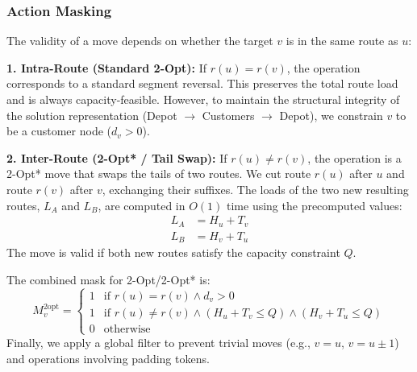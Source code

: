 \documentclass[letterpaper]{article} %
\begin{document}
\subsubsection{Action Masking}
The validity of a move depends on whether the target $v$ is in the same route as $u$:

\textbf{1. Intra-Route (Standard 2-Opt):}
If $r(u) = r(v)$, the operation corresponds to a standard segment reversal. This preserves the total route load and is always capacity-feasible. However, to maintain the structural integrity of the solution representation (Depot $\to$ Customers $\to$ Depot), we constrain $v$ to be a customer node ($d_v > 0$).

\textbf{2. Inter-Route (2-Opt* / Tail Swap):}
If $r(u) \neq r(v)$, the operation is a 2-Opt* move that swaps the tails of two routes. We cut route $r(u)$ after $u$ and route $r(v)$ after $v$, exchanging their suffixes. The loads of the two new resulting routes, $L_A$ and $L_B$, are computed in $O(1)$ time using the precomputed values:
\begin{align}
    L_A &= H_u + T_v \\
    L_B &= H_v + T_u
\end{align}
The move is valid if both new routes satisfy the capacity constraint $Q$.

The combined mask for 2-Opt/2-Opt* is:
\begin{equation}
    M_v^{\text{2opt}} =
    \begin{cases}
        1 & \text{if } r(u) = r(v) \land d_v > 0 \\
        1 & \text{if } r(u) \neq r(v) \land (H_u + T_v \leq Q) \land (H_v + T_u \leq Q) \\
        0 & \text{otherwise}
    \end{cases}
\end{equation}
Finally, we apply a global filter to prevent trivial moves (e.g., $v = u$, $v = u \pm 1$) and operations involving padding tokens.
\end{document}
